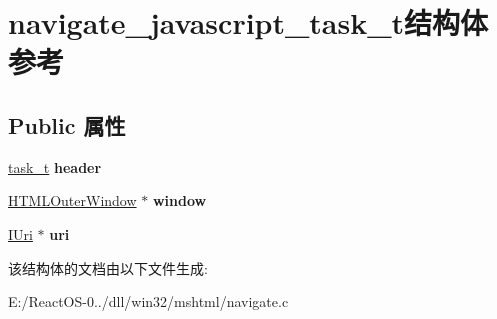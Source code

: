 \hypertarget{structnavigate__javascript__task__t}{}\section{navigate\+\_\+javascript\+\_\+task\+\_\+t结构体 参考}
\label{structnavigate__javascript__task__t}
\subsection*{Public 属性}
\begin{DoxyCompactItemize}
\item 
\mbox{\label{structnavigate__javascript__task__t_ab5e798e754ac6b92ddf4d16b3ed2b690}} 
\hyperlink{structtask__t}{task\+\_\+t} {\bfseries header}
\item 
\mbox{\label{structnavigate__javascript__task__t_a180a7b62fd877aeb690be5729efeaf3b}} 
\hyperlink{struct_h_t_m_l_outer_window}{H\+T\+M\+L\+Outer\+Window} $\ast$ {\bfseries window}
\item 
\mbox{\label{structnavigate__javascript__task__t_af04a25e2ec061129f78939bd168d903d}} 
\hyperlink{interface_i_uri}{I\+Uri} $\ast$ {\bfseries uri}
\end{DoxyCompactItemize}


该结构体的文档由以下文件生成\+:\begin{DoxyCompactItemize}
\item 
E\+:/\+React\+O\+S-\/0../dll/win32/mshtml/navigate.\+c\end{DoxyCompactItemize}
